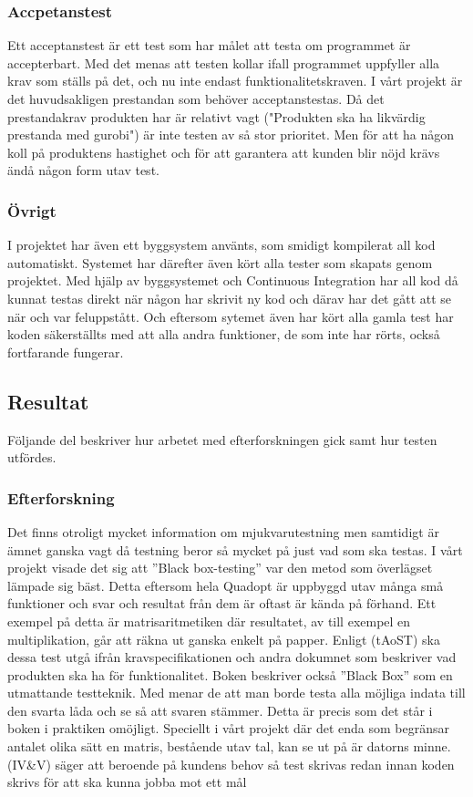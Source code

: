 \subsubsection{Accpetanstest}	
	Ett acceptanstest är ett test som har målet att testa om programmet är accepterbart. Med det menas att testen kollar ifall programmet uppfyller alla krav som ställs på det, och nu inte endast funktionalitetskraven. I vårt projekt är det huvudsakligen prestandan som behöver acceptanstestas. Då det prestandakrav produkten har är relativt vagt ("Produkten ska ha likvärdig prestanda med gurobi") är inte testen av så stor prioritet. Men för att ha någon koll på produktens hastighet och för att garantera att kunden blir nöjd krävs ändå någon form utav test.
\subsubsection{Övrigt}	
	I projektet har även ett byggsystem använts, som smidigt kompilerat all kod automatiskt. Systemet har därefter även kört alla tester som skapats genom projektet.
	Med hjälp av byggsystemet och Continuous Integration har all kod då kunnat testas direkt när någon har skrivit ny kod och därav har det gått att se när och var feluppstått. Och eftersom sytemet även har kört alla gamla test har koden säkerställts med att alla andra funktioner, de som inte har rörts, också fortfarande fungerar.   	
	
	\subsection{Resultat}	
	Följande del beskriver hur arbetet med efterforskningen gick samt hur testen utfördes.
	\subsubsection{Efterforskning}
	Det finns otroligt mycket information om mjukvarutestning men samtidigt är ämnet ganska vagt då testning beror så mycket på just vad som ska testas. I vårt projekt visade det sig att ''Black box-testing'' var den metod som överlägset lämpade sig bäst. Detta eftersom hela Quadopt är uppbyggd utav många små funktioner och svar och resultat från dem är oftast är kända på förhand. Ett exempel på detta är matrisaritmetiken där resultatet, av till exempel en multiplikation, går att räkna ut ganska enkelt på papper. Enligt (tAoST) ska dessa test utgå ifrån kravspecifikationen och andra dokumnet som beskriver vad produkten ska ha för funktionalitet. Boken beskriver också ''Black Box'' som en utmattande testteknik. Med menar de att man borde testa alla möjliga indata till den svarta låda och se så att svaren stämmer. Detta är precis som det står i boken i praktiken omöjligt. Speciellt i vårt projekt där det enda som begränsar antalet olika sätt en matris, bestående utav tal, kan se ut på är datorns minne. (IV\&V) säger att beroende på kundens behov så test skrivas redan innan koden skrivs för att ska kunna jobba mot ett mål \newline
	
